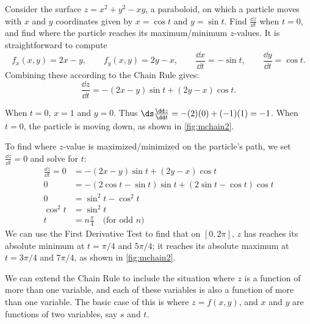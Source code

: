 \begin{example}\label{ex_mchain2}
Consider the surface $z=x^2+y^2-xy$, a paraboloid, on which a particle moves with $x$ and $y$ coordinates given by $x=\cos t$ and $y=\sin t$. Find $\frac{\dd z}{\dd t}$ when $t=0$, and find where the particle reaches its maximum/minimum $z$-values.
\solution
It is straightforward to compute
\[f_x(x,y) = 2x-y,\qquad f_y(x,y) = 2y-x,\qquad \frac{\dd x}{\dd t} = -\sin t,\qquad \frac{\dd y}{\dd t} = \cos t.\]
Combining these according to the Chain Rule gives:
\[\frac{\dd z}{\dd t} = -(2x-y)\sin t + (2y-x)\cos t.\]

When $t=0$, $x=1$ and $y=0$. Thus $\ds\frac{\dd z}{\dd t} = -(2)(0)+ (-1)(1) = -1$. When $t=0$, the particle is moving down, as shown in \autoref{fig:mchain2}. 


To find where $z$-value is maximized/minimized on the particle's path, we set $\frac{\dd z}{\dd t}=0$ and solve for $t$:
\begin{align*}
\frac{\dd z}{\dd t} =0
	&= -(2x-y)\sin t + (2y-x)\cos t\\
	0&= -(2\cos t-\sin t)\sin t+(2\sin t-\cos t)\cos t\\
	0&= \sin^2t-\cos^2t\\
\cos^2t &=\sin^2t\\
	t&= n\frac{\pi}4\quad \text{(for odd $n$)}
\end{align*}
We can use the First Derivative Test to find that on $[0,2\pi]$, $z$ has reaches its absolute minimum at $t=\pi/4$ and $5\pi/4$; it reaches its absolute maximum at $t=3\pi/4$ and $7\pi/4$, as shown in \autoref{fig:mchain2}.
\end{example}


We can extend the Chain Rule to include the situation where $z$ is a function of more than one variable, and each of these variables is also a function of more than one variable. The basic case of this is where $z=f(x,y)$, and $x$ and $y$ are functions of two variables, say $s$ and $t$.

